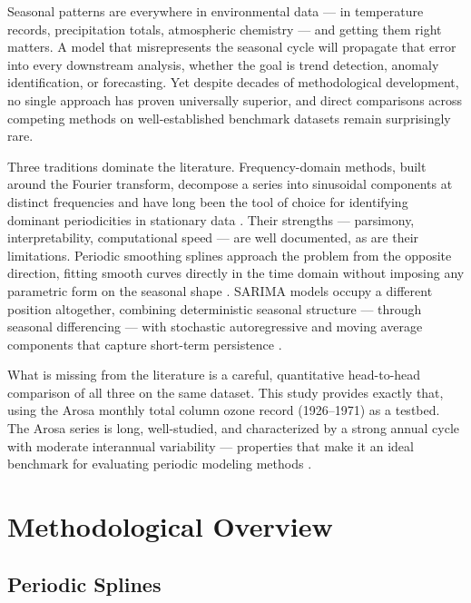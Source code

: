 \documentclass[10pt,twoside]{article}
\numberwithin{equation}{section}
\begin{document}
Seasonal patterns are everywhere in environmental data — in temperature records, precipitation totals, atmospheric chemistry — and getting them right matters. A model that misrepresents the seasonal cycle will propagate that error into every downstream analysis, whether the goal is trend detection, anomaly identification, or forecasting. Yet despite decades of methodological development, no single approach has proven universally superior, and direct comparisons across competing methods on well-established benchmark datasets remain surprisingly rare.



Three traditions dominate the literature. Frequency-domain methods, built around the Fourier transform, decompose a series into sinusoidal components at distinct frequencies and have long been the tool of choice for identifying dominant periodicities in stationary data \cite{Brockwell2016}. Their strengths — parsimony, interpretability, computational speed — are well documented, as are their limitations. Periodic smoothing splines approach the problem from the opposite direction, fitting smooth curves directly in the time domain without imposing any parametric form on the seasonal shape \cite{Wood2017}. SARIMA models occupy a different position altogether, combining deterministic seasonal structure — through seasonal differencing — with stochastic autoregressive and moving average components that capture short-term persistence \cite{Hyndman2021, Box2015}.



What is missing from the literature is a careful, quantitative head-to-head comparison of all three on the same dataset. This study provides exactly that, using the Arosa monthly total column ozone record (1926–1971) as a testbed. The Arosa series is long, well-studied, and characterized by a strong annual cycle with moderate interannual variability — properties that make it an ideal benchmark for evaluating periodic modeling methods \cite{Wood2017}.



\section{Methodological Overview}



\subsection{Periodic Splines}
\end{document}
